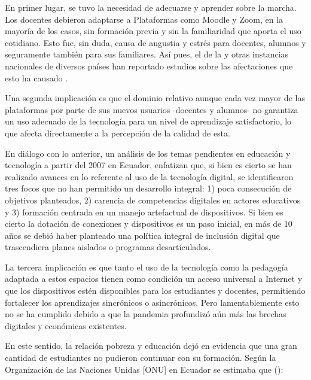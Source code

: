 \documentclass[spanish]{textolivre}
\begin{document}
En primer lugar, se tuvo la necesidad de adecuarse y aprender sobre la marcha. Los docentes debieron adaptarse a Plataformas como Moodle y Zoom, en la mayoría de los casos, sin formación previa y sin la familiaridad que aporta el uso cotidiano. Esto fue, sin duda, causa de angustia y estrés para docentes, alumnos y seguramente también para sus familiares. Así pues, el \textcite{laboratorio_latinoamericano_de_evaluacion_de_la_calidad_de_la_educacion_[llece]_sistemas_2020} de la \textcite{unesco_bid_2020} y otras instancias nacionales de diversos países han reportado estudios sobre las afectaciones que esto ha causado \cite{unesco_bid_2020}.

Una segunda implicación es que el dominio relativo aunque cada vez mayor de las plataformas por parte de sus nuevos usuarios -docentes y alumnos- no garantiza un uso adecuado de la tecnología para un nivel de aprendizaje satisfactorio, lo que afecta directamente a la percepción de la calidad de esta. 

En diálogo con lo anterior, un análisis de los temas pendientes en educación y tecnología a partir del 2007 en Ecuador, \textcite{apolo_pending_2020a} enfatizan que, si bien es cierto se han realizado avances en lo referente al uso de la tecnología digital, se identificaron tres focos que no han permitido un desarrollo integral: 1) poca consecución de objetivos planteados, 2) carencia de competencias digitales en actores educativos y 3) formación centrada en un manejo artefactual de dispositivos. Si bien es cierto la dotación de conexiones y dispositivos es un paso inicial, en más de 10 años se debió haber planteado una política integral de inclusión digital que trascendiera planes aislados o programas desarticulados.

La tercera implicación es que tanto el uso de la tecnología como la pedagogía adaptada a estos espacios tienen como condición un acceso universal a Internet y que los dispositivos estén disponibles para los estudiantes y docentes, permitiendo fortalecer los aprendizajes sincrónicos o asincrónicos. Pero lamentablemente esto no se ha cumplido debido a que la pandemia profundizó aún más las brechas digitales y económicas existentes.

En este sentido, la relación pobreza y educación dejó en evidencia que una gran cantidad de estudiantes no pudieron continuar con su formación. Según la Organización de las Naciones Unidas [ONU] en Ecuador se estimaba que ():
\end{document}
